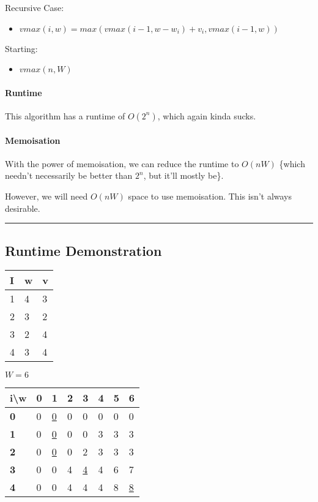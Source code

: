 \documentclass[
]{article}
\providecommand{\tightlist}{%
  \setlength{\itemsep}{0pt}\setlength{\parskip}{0pt}}
\begin{document}
Recursive Case:

\begin{itemize}
\tightlist
\item
  {\(vmax(i,w) = max(vmax(i - 1,w - w_{i}) + v_{i},vmax(i - 1,w))\)}
\end{itemize}

Starting:

\begin{itemize}
\tightlist
\item
  {\(vmax(n,W)\)}
\end{itemize}

\hypertarget{runtime}{%
\paragraph{Runtime}\label{runtime}}

This algorithm has a runtime of {\(O(2^{n})\)}, which again kinda sucks.

\hypertarget{memoisation}{%
\paragraph{Memoisation}\label{memoisation}}

With the power of memoisation, we can reduce the runtime to {\(O(nW)\)}
\{which needn't necessarily be better than {\(2^{n}\)}, but it'll mostly
be\}.

However, we will need {\(O(nW)\)} space to use memoisation. This isn't
always desirable.

\begin{center}\rule{0.5\linewidth}{0.5pt}\end{center}

\hypertarget{runtime-demonstration}{%
\subsection{Runtime Demonstration}\label{runtime-demonstration}}

\begin{longtable}[]{@{}lll@{}}
\toprule
I & w & v \\
\midrule
\endhead
1 & 4 & 3 \\
2 & 3 & 2 \\
3 & 2 & 4 \\
4 & 3 & 4 \\
\bottomrule
\end{longtable}

{\(W = 6\)}

\begin{longtable}[]{@{}llllllll@{}}
\toprule
i\textbackslash w & 0 & 1 & 2 & 3 & 4 & 5 & 6 \\
\midrule
\endhead
\textbf{0} & 0 & \uline{0} & 0 & 0 & 0 & 0 & 0 \\
\textbf{1} & 0 & \uline{0} & 0 & 0 & 3 & 3 & 3 \\
\textbf{2} & 0 & \uline{0} & 0 & 2 & 3 & 3 & 3 \\
\textbf{3} & 0 & 0 & 4 & \uline{4} & 4 & 6 & 7 \\
\textbf{4} & 0 & 0 & 4 & 4 & 4 & 8 & \uline{8} \\
\bottomrule
\end{longtable}
\end{document}
